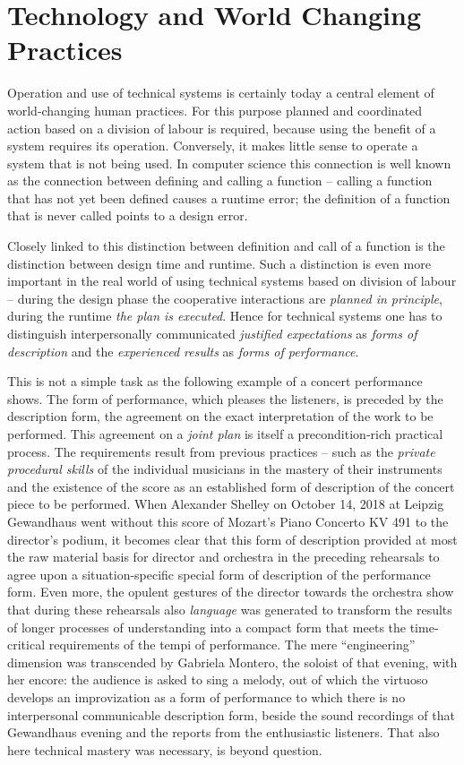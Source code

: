\documentclass[11pt,a4paper]{article}
\begin{document}
\section{Technology and World Changing Practices}

Operation and use of technical systems is certainly today a central element of
world-changing human practices. For this purpose planned and coordinated
action based on a division of labour is required, because using the benefit of
a system requires its operation. Conversely, it makes little sense to operate
a system that is not being used. In computer science this connection is well
known as the connection between defining and calling a function -- calling a
function that has not yet been defined causes a runtime error; the definition
of a function that is never called points to a design error.

Closely linked to this distinction between definition and call of a function
is the distinction between design time and runtime. Such a distinction is even
more important in the real world of using technical systems based on division
of labour -- during the design phase the cooperative interactions are
\emph{planned in principle}, during the runtime \emph{the plan is executed}.
Hence for technical systems one has to distinguish interpersonally
communicated \emph{justified expectations} as \emph{forms of description} and
the \emph{experienced results} as \emph{forms of performance}.

This is not a simple task as the following example of a concert performance
shows. The form of performance, which pleases the listeners, is preceded by
the description form, the agreement on the exact interpretation of the work to
be performed. This agreement on a \emph{joint plan} is itself a
precondition-rich practical process. The requirements result from previous
practices -- such as the \emph{private procedural skills} of the individual
musicians in the mastery of their instruments and the existence of the score
as an established form of description of the concert piece to be
performed. When Alexander Shelley on October 14, 2018 at Leipzig Gewandhaus
went without this score of Mozart's Piano Concerto KV 491 to the director's
podium, it becomes clear that this form of description provided at most the
raw material basis for director and orchestra in the preceding rehearsals to
agree upon a situation-specific special form of description of the performance
form. Even more, the opulent gestures of the director towards the orchestra
show that during these rehearsals also \emph{language} was generated to
transform the results of longer processes of understanding into a compact form
that meets the time-critical requirements of the tempi of performance.  The
mere ``engineering'' dimension was transcended by Gabriela Montero, the
soloist of that evening, with her encore: the audience is asked to sing a
melody, out of which the virtuoso develops an improvization as a form of
performance to which there is no interpersonal communicable description form,
beside the sound recordings of that Gewandhaus evening and the reports from
the enthusiastic listeners. That also here technical mastery was necessary, is
beyond question.
\end{document}
